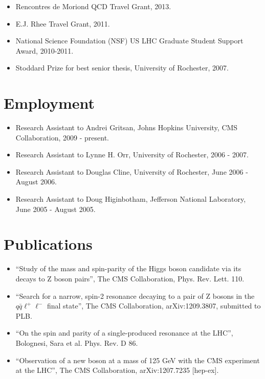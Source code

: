 \documentclass[12pt,oneside,final]{thesis}
\begin{document}
\begin{vita}
\begin{itemize}
\item Rencontres de Moriond QCD Travel Grant, 2013. 
\item E.J. Rhee Travel Grant, 2011.
\item National Science Foundation (NSF) US LHC Graduate Student Support Award, 2010-2011.
\item Stoddard Prize for best senior thesis, University of Rochester, 2007. 
\end{itemize}

\section*{Employment}

\begin{itemize}
\item Research Assistant to Andrei Gritsan, Johns Hopkins University, CMS Collaboration, 2009 - present.
\item Research Assistant to Lynne H. Orr, University of Rochester, 2006 - 2007.
\item Research Assistant to Douglas Cline, University of Rochester, June 2006 - August 2006.
\item Research Assistant to Doug Higinbotham, Jefferson National Laboratory, June 2005 - August 2005.
\end{itemize}

\section*{Publications}


\begin{itemize}

\item ``Study of the mass and spin-parity of the Higgs boson candidate via its decays to Z boson pairs'', The CMS Collaboration, Phys. Rev. Lett. 110. 

\item ``Search for a narrow, spin-2 resonance decaying to a pair of Z bosons in the $q\bar{q}\ell^+\ell^-$ final state'', The CMS Collaboration, arXiv:1209.3807, submitted to PLB.

\item ``On the spin and parity of a single-produced resonance at the LHC'', Bolognesi, Sara et al. Phys. Rev. D 86.

\item ``Observation of a new boson at a mass of 125 GeV with the CMS experiment at the LHC'', The CMS Collaboration, arXiv:1207.7235 [hep-ex].


\end{itemize}
\end{vita}
\end{document}
